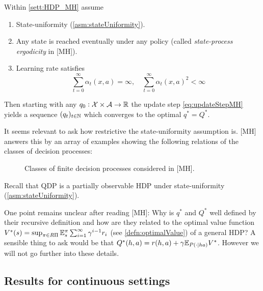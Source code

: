 \begin{thm}
  Within \cref{sett:HDP_MH} assume
  \begin{enumerate}
    \item State-uniformity (\cref{asm:stateUniformity}).
    \item Any state is reached eventually under any policy
      (called \emph{state-process ergodicity} in [MH]).
    \item Learning rate satisfies
      \[ \sum_{t=0}^\infty \alpha_t(x, a) = \infty, \quad
      \sum_{t=0}^\infty \alpha_t(x, a)^2 < \infty \]
  \end{enumerate}
  Then starting with any $q_0 : \mathcal{X} \times \mathcal{A} \to \mathbb{R}$
  the update step \cref{eq:updateStepMH} yields a sequence
  $(q_t)_{t \in \mathbb{N}}$ which converges to the optimal $q^* = Q^*$.
\end{thm}

It seems relevant to ask how restrictive the state-uniformity assumption is.
[MH] answers this by an array of examples showing the following
relations of the classes of decision processes:

\begin{figure}[H]
  \centering
  \caption{Classes of finite decision processes considered in [MH].}
  \label{fig:DPMH}
\end{figure}

Recall that QDP is a partially observable HDP under state-uniformity
(\cref{asm:stateUniformity}).

One point remains unclear after reading [MH]:
Why is $q^*$ and $Q^*$ well defined by their recursive definition
and how are they related to the optimal value function
$V^*(s) = \sup_{\pi \in R\Pi} \mathbb{E}_s^\pi
\sum_{i=1}^\infty \gamma^{i-1} r_i $
(see \cref{defn:optimalValue})
of a general HDP?
A sensible thing to ask would be that
$Q^*(h, a) = r(h, a) + \gamma \mathbb{E}_{P(\cdot \mid h a)} V^*$.
However we will not go further into these details.

\subsection{Results for continuous settings}


